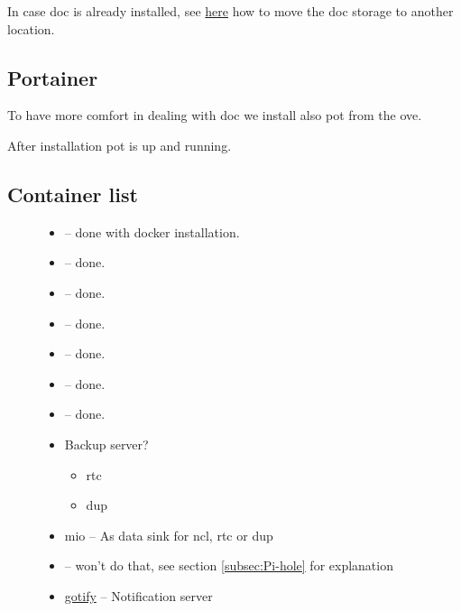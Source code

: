 In case \gls{doc} is already installed, see \href{https://www.reddit.com/r/OpenMediaVault/comments/fl40gf/moving_docker_storage/}{here}
how to move the \gls{doc} storage to another location.

\subsection{Portainer}

To have more comfort in dealing with \gls{doc} we install also \gls{pot}
from the \gls{ove}.


After installation \gls{pot} is up and running.


\subsection{Container list}

\begin{figure}[H]
    \begin{itemize}
        \item {}
              -- done with docker installation.
        \item {}
              -- done.
        \item {}
              -- done.
        \item {}
              -- done.
        \item {}
              -- done.
        \item {}
              -- done.
        \item {}
              -- done.
        \item Backup server?
              \begin{itemize}
                  \item \gls{rtc}
                  \item \gls{dup}
              \end{itemize}
        \item \gls{mio} -- As data sink for \gls{ncl},
              \gls{rtc} or \gls{dup}
        \item {}
              -- won't do that, see section \ref{subsec:Pi-hole} for explanation
        \item \href{https://gotify.net/}{gotify} -- Notification server
    \end{itemize}
\end{figure}

